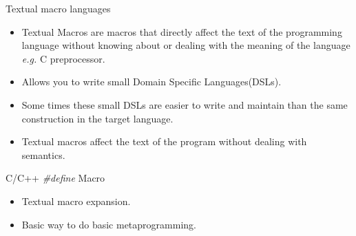 \begin{frame}{Textual macro languages}
    \begin{itemize}
        \item Textual Macros are macros that directly affect the text of the 
            programming language without knowing about or dealing with the 
            meaning of the language \emph{e.g.} C preprocessor\cite{macrosibm}. 

        \item Allows you to write small Domain Specific Languages(DSLs).

        \item Some times these small DSLs are easier to write and maintain than
            the same construction in the target language.

        \item Textual macros affect the text of the program without dealing 
            with semantics.
    \end{itemize}
\end{frame}

\begin{frame}{C/C++ \emph{\#define} Macro}
    \begin{itemize}\addtolength{\itemsep}{1\baselineskip}
        \item Textual macro expansion.

        \item Basic way to do basic metaprogramming.
    \end{itemize}
\end{frame}



